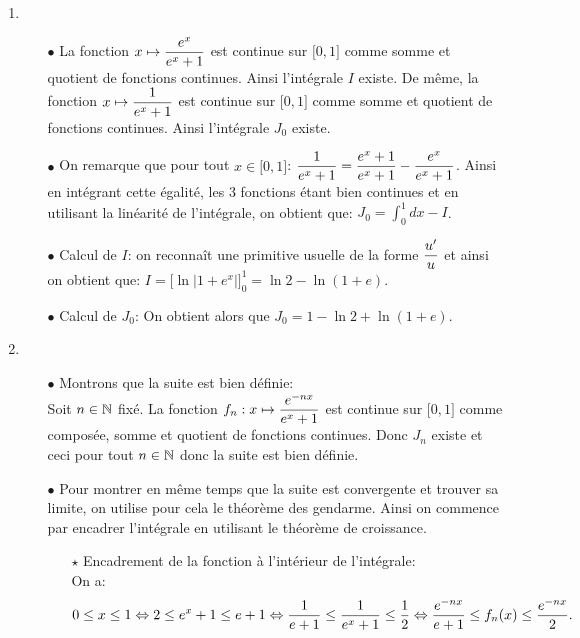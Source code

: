 \documentclass[a4paper, 11pt,reqno]{article}
\begin{document}
\begin{correction}\;
	\begin{enumerate}
		\item
		      \begin{itemize}
			      \item[$\bullet$] La fonction $x\mapsto \displaystyle\frac{e^x}{e^x+1}$ est continue sur $\lbrack 0,1\rbrack$ comme somme et quotient de fonctions continues. Ainsi l'int\'egrale $I$ existe. De m\^{e}me, la fonction $x\mapsto \displaystyle\frac{1}{e^x+1}$ est continue sur $\lbrack 0,1\rbrack$ comme somme et quotient de fonctions continues. Ainsi l'int\'egrale $J_0$ existe.
			      \item[$\bullet$] On remarque que pour tout $x\in\lbrack 0,1\rbrack$: $\displaystyle\frac{1}{e^x+1}=\displaystyle\frac{e^x+1}{e^x+1}-\displaystyle\frac{e^x}{e^x+1}$. Ainsi en int\'egrant cette \'egalit\'e, les 3 fonctions \'etant bien continues et en utilisant la lin\'earit\'e de l'int\'egrale, on obtient que: $J_0=\int_{0}^1 dx-I$.
			      \item[$\bullet$] Calcul de $I$: on reconna\^{i}t une primitive usuelle de la forme $\displaystyle\frac{u^{\prime}}{u}$ et ainsi on obtient que: $I=\lbrack \ln{|1+e^x|}\rbrack_0^1=\ln{2}-\ln{(1+e)}$.
			      \item[$\bullet$] Calcul de $J_0$: On obtient alors que $J_0=1-\ln{2}+\ln{(1+e)}$.
		      \end{itemize}
		\item
		      \begin{itemize}
			      \item[$\bullet$] Montrons que la suite est bien d\'efinie:\\
			            \noindent Soit $n\in\mathbb{N}$ fix\'e. La fonction $f_n: x\mapsto  \displaystyle\frac{e^{-nx}}{e^x+1}$ est continue sur $\lbrack 0,1\rbrack$ comme compos\'ee, somme et quotient de fonctions continues. Donc $J_n$ existe et ceci pour tout $n\in\mathbb{N}$ donc la suite est bien d\'efinie.
			      \item[$\bullet$] Pour montrer en m\^{e}me temps que la suite est convergente et trouver sa limite, on utilise pour cela le th\'eor\`{e}me des gendarme. Ainsi on commence par encadrer l'int\'egrale en utilisant le th\'eor\`{e}me de croissance.
			            \begin{itemize}
				            \item[$\star$] Encadrement de la fonction \`{a} l'int\'erieur de l'int\'egrale:\\
				                  \noindent On a:
				                  $$0\leq x \leq 1\Leftrightarrow 2\leq e^x+1\leq e+1\Leftrightarrow \displaystyle\frac{1}{e+1}\leq \displaystyle\frac{1}{e^x+1}\leq \displaystyle\frac{1}{2}\Leftrightarrow \displaystyle\frac{e^{-nx}}{e+1}\leq f_n(x)\leq \displaystyle\frac{e^{-nx}}{2}.$$

\end{itemize}
\end{itemize}
\end{enumerate}
\end{correction}
\end{document}
